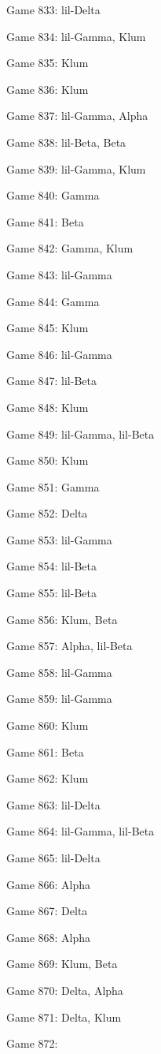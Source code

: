 \documentclass{article}
\begin{document}
\begin{multicols}{3}
\begin{compactitem}
\item Game 833:
lil-Delta
\item Game 834:
lil-Gamma, Klum
\item Game 835:
Klum
\item Game 836:
Klum
\item Game 837:
lil-Gamma, Alpha
\item Game 838:
lil-Beta, Beta
\item Game 839:
lil-Gamma, Klum
\item Game 840:
Gamma
\item Game 841:
Beta
\item Game 842:
Gamma, Klum
\item Game 843:
lil-Gamma
\item Game 844:
Gamma
\item Game 845:
Klum
\item Game 846:
lil-Gamma
\item Game 847:
lil-Beta
\item Game 848:
Klum
\item Game 849:
lil-Gamma, lil-Beta
\item Game 850:
Klum
\item Game 851:
Gamma
\item Game 852:
Delta
\item Game 853:
lil-Gamma
\item Game 854:
lil-Beta
\item Game 855:
lil-Beta
\item Game 856:
Klum, Beta
\item Game 857:
Alpha, lil-Beta
\item Game 858:
lil-Gamma
\item Game 859:
lil-Gamma
\item Game 860:
Klum
\item Game 861:
Beta
\item Game 862:
Klum
\item Game 863:
lil-Delta
\item Game 864:
lil-Gamma, lil-Beta
\item Game 865:
lil-Delta
\item Game 866:
Alpha
\item Game 867:
Delta
\item Game 868:
Alpha
\item Game 869:
Klum, Beta
\item Game 870:
Delta, Alpha
\item Game 871:
Delta, Klum
\item Game 872:

\end{compactitem}
\end{multicols}
\end{document}
